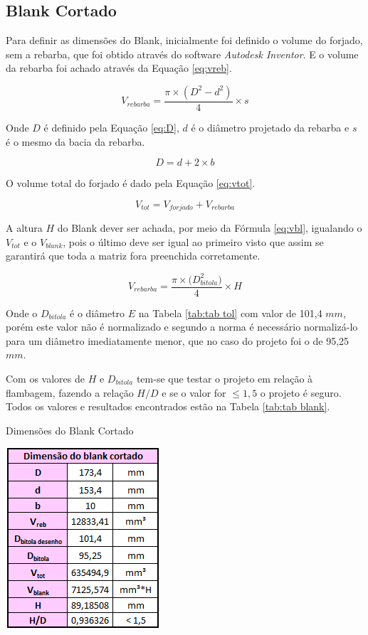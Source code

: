 \documentclass[deposito, acronym, symbols]{fei}
\begin{document}
\subsection{Blank Cortado}  \label{blank}

Para definir as dimensões do Blank, inicialmente foi definido o volume do forjado, sem a rebarba, que foi obtido através do software \textit{Autodesk Inventor}. E o volume da rebarba foi achado através da Equação \ref{eq:vreb}.

\begin{equation}
    \label{eq:vreb}
    V_{rebarba}= \frac{\pi\times({D^{2}-d^{2}})}{4}\times{s}
\end{equation} 

Onde $D$ é definido pela Equação \ref{eq:D}, $d$ é o diâmetro projetado da rebarba e $s$ é o mesmo da bacia da rebarba.

\begin{equation}
    \label{eq:D}
      D = d+2\times{b}
\end{equation} 

O volume total do forjado é dado pela Equação \ref{eq:vtot}. 

\begin{equation}
    \label{eq:vtot}
    V_{tot}= V_{forjado}+V_{rebarba}
\end{equation} 

A altura $H$ do Blank dever ser achada, por meio da Fórmula \ref{eq:vbl}, igualando o $V_{tot}$ e o $V_{blank}$, pois o último deve ser igual ao primeiro visto que assim se garantirá que toda a matriz fora preenchida corretamente. 

\begin{equation}
    \label{eq:vbl}
    V_{rebarba}= \frac{\pi\times({D_{bitola}^{2})}}{4}\times{H}
\end{equation} 

Onde o $D_{bitola}$ é o diâmetro $E$ na Tabela \ref{tab:tab tol} com valor de 101,4 $mm$, porém este valor não é normalizado e segundo a norma é necessário normalizá-lo para um diâmetro imediatamente menor, que no caso do projeto foi o de 95,25 $mm$.

Com os valores de $H$ e $D_{bitola}$ tem-se que testar o projeto em relação à flambagem, fazendo a relação $H/D$ e se o valor for $\leq 1,5$ o projeto é seguro. Todos os valores e resultados encontrados estão na Tabela \ref{tab:tab blank}.

\begin{table}[!htb]
 \centering
    \caption{Dimensões do Blank Cortado}
    \includegraphics[width=0.3\linewidth]{Imagens/dim blank.png}
    \label{tab:tab blank}
 \end{table}
 
\end{document}
